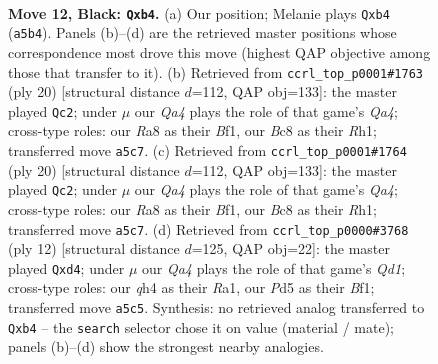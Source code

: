 \documentclass[11pt]{article}
\begin{document}
\begin{figure}[p]\centering
\begin{subfigure}{0.46\textwidth}\centering
\resizebox{\linewidth}{!}{%
\newchessgame
\chessboard[
  setfen={r1b1k2r/pp1nbppp/2n1p3/q2pP3/1P1P3Q/3B1PP1/P2N3P/R1B1K1NR b KQ - 0 12},
  showmover=false,
  pgfstyle=straightmove, color=movearrow, markmove={a5-b4}
]}
\caption{}
\end{subfigure}\hfill
\begin{subfigure}{0.46\textwidth}\centering
\resizebox{\linewidth}{!}{%
\newchessgame
\chessboard[
  setfen={r1b1k2r/p1p2pp1/2n1pn1p/1p1q4/Q1pP3B/2P1P3/P2N1PPP/R3KB1R w KQkq - 0 11},
  showmover=false,
  pgfstyle=straightmove, color=movearrow, markmove={a4-c2}
]}
\caption{}
\end{subfigure}
\\[4pt]
\begin{subfigure}{0.46\textwidth}\centering
\resizebox{\linewidth}{!}{%
\newchessgame
\chessboard[
  setfen={r1b1k2r/p1p2pp1/2n1pn1p/1p1q4/Q1pP3B/2P1P3/P2N1PPP/R3KB1R w KQkq - 0 11},
  showmover=false,
  pgfstyle=straightmove, color=movearrow, markmove={a4-c2}
]}
\caption{}
\end{subfigure}\hfill
\begin{subfigure}{0.46\textwidth}\centering
\resizebox{\linewidth}{!}{%
\newchessgame
\chessboard[
  setfen={rnbqkbnr/p4ppp/2p5/1p6/P1ppP3/2N2N2/1P3PPP/R1BQKB1R w KQkq - 0 7},
  showmover=false,
  pgfstyle=straightmove, color=movearrow, markmove={d1-d4}
]}
\caption{}
\end{subfigure}
\caption{\textbf{Move 12, Black: \texttt{Qxb4}.} (a) Our position; Melanie plays \texttt{Qxb4} (\texttt{a5b4}). Panels (b)--(d) are the retrieved master positions whose correspondence most drove this move (highest QAP objective among those that transfer to it). (b) Retrieved from \texttt{ccrl\_top\_p0001\#1763} (ply 20) [structural distance $d$=112, QAP obj=133]: the master played \texttt{Qc2}; under $\mu$ our \emph{Qa4} plays the role of that game's \emph{Qa4}; cross-type roles: our \emph{R}a8 as their \emph{B}f1, our \emph{B}c8 as their \emph{R}h1; transferred move \texttt{a5c7}. (c) Retrieved from \texttt{ccrl\_top\_p0001\#1764} (ply 20) [structural distance $d$=112, QAP obj=133]: the master played \texttt{Qc2}; under $\mu$ our \emph{Qa4} plays the role of that game's \emph{Qa4}; cross-type roles: our \emph{R}a8 as their \emph{B}f1, our \emph{B}c8 as their \emph{R}h1; transferred move \texttt{a5c7}. (d) Retrieved from \texttt{ccrl\_top\_p0000\#3768} (ply 12) [structural distance $d$=125, QAP obj=22]: the master played \texttt{Qxd4}; under $\mu$ our \emph{Qa4} plays the role of that game's \emph{Qd1}; cross-type roles: our \emph{q}h4 as their \emph{R}a1, our \emph{P}d5 as their \emph{B}f1; transferred move \texttt{a5c5}. Synthesis: no retrieved analog transferred to \texttt{Qxb4} -- the \texttt{search} selector chose it on value (material / mate); panels (b)--(d) show the strongest nearby analogies.}
\label{fig:thought-m23}
\end{figure}
\end{document}
